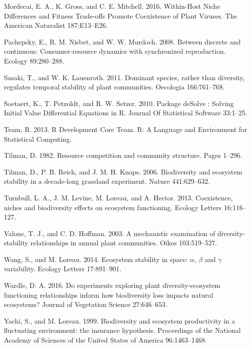 \documentclass[12pt,]{article}
\begin{document}
Mordecai, E. A., K. Gross, and C. E. Mitchell. 2016. Within-Host Niche
Differences and Fitness Trade-offs Promote Coexistence of Plant Viruses.
The American Naturalist 187:E13--E26.

Pachepsky, E., R. M. Nisbet, and W. W. Murdoch. 2008. Between discrete
and continuous: Consumer-resource dynamics with synchronized
reproduction. Ecology 89:280--288.

Sasaki, T., and W. K. Lauenroth. 2011. Dominant species, rather than
diversity, regulates temporal stability of plant communities. Oecologia
166:761--768.

Soetaert, K., T. Petzoldt, and R. W. Setzer. 2010. Package deSolve :
Solving Initial Value Differential Equations in R. Journal Of
Statistical Software 33:1--25.

Team, R. 2013. R Development Core Team. R: A Language and Environment
for Statistical Computing.

Tilman, D. 1982. Resource competition and community structure. Pages
1--296.

Tilman, D., P. B. Reich, and J. M. H. Knops. 2006. Biodiversity and
ecosystem stability in a decade-long grassland experiment. Nature
441:629--632.

Turnbull, L. A., J. M. Levine, M. Loreau, and A. Hector. 2013.
Coexistence, niches and biodiversity effects on ecosystem functioning.
Ecology Letters 16:116--127.

Valone, T. J., and C. D. Hoffman. 2003. A mechanistic examination of
diversity-stability relationships in annual plant communities. Oikos
103:519--527.

Wang, S., and M. Loreau. 2014. Ecosystem stability in space: \(\alpha\),
\(\beta\) and \(\gamma\) variability. Ecology Letters 17:891--901.

Wardle, D. A. 2016. Do experiments exploring plant diversity-ecosystem
functioning relationships inform how biodiversity loss impacts natural
ecosystems? Journal of Vegetation Science 27:646--653.

Yachi, S., and M. Loreau. 1999. Biodiversity and ecosystem productivity
in a fluctuating environment: the insurance hypothesis. Proceedings of
the National Academy of Sciences of the United States of America
96:1463--1468.
\end{document}
